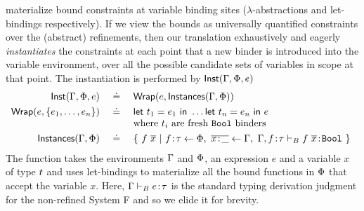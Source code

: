  materialize bound
constraints at variable binding sites ($\lambda$-abstractions
and let-bindings respectively).
%
%
If we view the bounds as universally quantified constraints
over the (abstract) refinements, then our translation exhaustively
and eagerly \emph{instantiates} the constraints at each point that
a new binder is introduced into the variable environment, over all
the possible candidate sets of variables in scope at that point.
%
The instantiation is performed by $\closure{\cenv}{\benv}{e}{x:\rtyp}$
%
$$\begin{array}{rcl}
\closure{\cenv}{\benv}{e}{\tbind{x}{\utyp}}
  & \defeq & {\wraplet{e}{\cands{\cenv}{\benv}}} \\[0.05in]
\wraplet{e}{\set{e_1,\ldots,e_n}}
  & \defeq & {\elett{t_1}{e_1}{\ldots} \elett{t_n}{e_n}{e}} \\
  &        & {\mbox{where $t_i$ are fresh \tbbool binders}} \\[0.05in]
\cands{\cenv}{\benv}
  & \defeq & \{ \  f\ \overline{x}  \ | \ \tbind{f}{\utyp} \leftarrow \benv
                  , \ \overline{\tbind{x}{\_}} \leftarrow \cenv,\
    \EXT{\cenv}{f}{\utyp} \vdash_B \tbind{ f\ \overline{x}}{\tbbool}\ \} \
\end{array}$$
The function takes the environments
$\cenv$ and $\benv$, an expression $e$ and a variable $x$ of type
$\rtyp$ and uses let-bindings to materialize all the bound
functions in $\benv$ that accept the variable $x$.
%
Here, $\cenv \vdash_B \tbind{e}{\utyp}$ is the standard typing
derivation judgment for the non-refined System F and so
we elide it for brevity.

